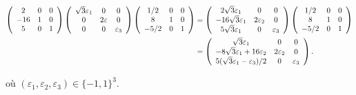 {{\begin{align*}\ensuremath
\left(
\begin{array}{ccc}
2&0&0\\
-16&1&0\\
5&0&1
\end{array}
\right)\left(
\begin{array}{ccc}
\sqrt{3}\varepsilon_1&0&0\\
0&2\varepsilon&0\\
0&0&\varepsilon_3
\end{array}
\right)\left(
\begin{array}{ccc}
1/2&0&0\\
8&1&0\\
-5/2&0&1
\end{array}
\right)&=\left(
\begin{array}{ccc}
2\sqrt{3}\varepsilon_1&0&0\\
-16\sqrt{3}\varepsilon_1&2\varepsilon_2&0\\
5\sqrt{3}\varepsilon_1&0&\varepsilon_3
\end{array}
\right)\left(
\begin{array}{ccc}
1/2&0&0\\
8&1&0\\
-5/2&0&1
\end{array}
\right)\\
 &=\left(
\begin{array}{ccc}
\sqrt{3}\varepsilon_1&0&0\\
-8\sqrt{3}\varepsilon_1+16\varepsilon_2&2\varepsilon_2&0\\
5(\sqrt{3}\varepsilon_1-\varepsilon_3)/2&0&\varepsilon_3
\end{array}
\right).
\end{align*}

où $(\varepsilon_1, \varepsilon_2,\varepsilon_3)\in\{-1,1\}^3$.
}
}
